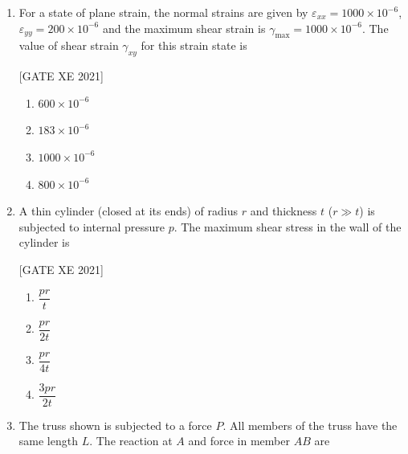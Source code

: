 \documentclass[journal,12pt,onecolumn]{IEEEtran}
\theoremstyle{remark}
\begin{document}
\begin{enumerate}[resume]
\hfill[GATE XE 2021]

\begin{multicols}{2}
\begin{enumerate}
\item $m=1,\; n=2$
\item $m=2,\; n=1$
\item $m=1,\; n=1$
\item $m=2,\; n=2$
\end{enumerate}
\end{multicols}

\item For a state of plane strain, the normal strains are given by $\varepsilon_{xx}=1000\times10^{-6}$, $\varepsilon_{yy}=200\times10^{-6}$ and the maximum shear strain is $\gamma_{\max}=1000\times10^{-6}$. The value of shear strain $\gamma_{xy}$ for this strain state is

\hfill[GATE XE 2021]

\begin{multicols}{2}
\begin{enumerate}
\item $600\times10^{-6}$
\item $183\times10^{-6}$
\item $1000\times10^{-6}$
\item $800\times10^{-6}$
\end{enumerate}
\end{multicols}

\item A thin cylinder (closed at its ends) of radius $r$ and thickness $t$ ($r\gg t$) is subjected to internal pressure $p$. The maximum shear stress in the wall of the cylinder is



\hfill[GATE XE 2021]

\begin{multicols}{2}
\begin{enumerate}
\item $\dfrac{pr}{t}$
\item $\dfrac{pr}{2t}$
\item $\dfrac{pr}{4t}$
\item $\dfrac{3pr}{2t}$
\end{enumerate}
\end{multicols}

\item The truss shown is subjected to a force $P$. All members of the truss have the same length $L$. The reaction at $A$ and force in member $AB$ are


\end{enumerate}
\end{document}
